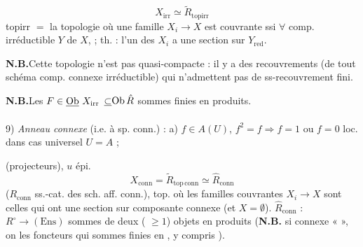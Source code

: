 \documentclass[11pt,a4paper]{article}
\begin{document}

\[
  X_{\mathrm{irr}} \simeq \tilde{R}_{\mathrm{topirr}}
\]
topirr $=$ la topologie où une famille $X_{i} \to X$ est couvrante ssi
\struck{\ill{}} $\forall$ comp. irréductible $Y$ de $X$, \ill{} \ill{} ;
th. : l'un des $X_{i}$ a une section sur $Y_{\mathrm{red}}$.

\textbf{N.B.}\quad Cette topologie n'est pas quasi-compacte : il y a des
recouvrements (de  tout schéma \struck{\ill{}}
 comp. connexe  \struck{\ill{}} irréductible)
qui n'admettent pas de ss-recouvrement fini.

\textbf{N.B.}\quad Les $F \in \struck{\mathrm{Ob}}\ X_{\mathrm{irr}}$
 $\uncertain{\subset}
\mathrm{Ob}\,\hat{R}$  sommes finies en produits.

9) \emph{Anneau connexe} (i.e. à sp. conn.) : a) $f \in A(U)$, $f^{2} = f
\Longrightarrow f = 1$ ou $f = 0$ loc.  dans cas universel
$U = A$ ;


(projecteurs), $u$ épi.
\[
  X_{\mathrm{conn}} = \tilde{R}_{\mathrm{top\,conn}} \simeq
  \hat{R}_{\mathrm{conn}}
\]
($R_{\mathrm{conn}}$ ss.-cat. des sch. aff. conn.),  top. où les
familles couvrantes $X_{i} \to X$ sont celles qui ont une section sur
 composante connexe (et   \ill{} $X = \emptyset$).
$\hat{R}_{\mathrm{conn}}$ : $R^{\circ} \to (\mathrm{Ens})$
 sommes \struck{\ill{}}  de deux
( $\geqslant 1$) objets en produits (\textbf{N.B.} si
\ill{} connexe \ill{} «  », on  les
foncteurs qui  \ill{} sommes finies en \ill{}, y compris
\ill{}).
\end{document}
